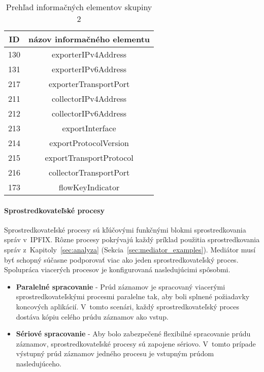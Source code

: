 \tabcolsep=8pt
\begin{table}[!ht]\caption{Prehľad informačných elementov skupiny 2}\label{t:ie-group2}
\smallskip
\centering
\begin{tabular}{|c|c|}
\hline
\textbf{ID} & \textbf{názov informačného elementu} \\ \hline
130 & exporterIPv4Address \\ \hline
131 & exporterIPv6Address \\ \hline
217 & exporterTransportPort \\ \hline
211 & collectorIPv4Address \\ \hline
212 & collectorIPv6Address \\ \hline
213 & exportInterface \\ \hline
214 & exportProtocolVersion \\ \hline
215 & exportTransportProtocol \\ \hline
216 & collectorTransportPort \\ \hline
173 & flowKeyIndicator \\ \hline
\end{tabular}
\end{table}

\paragraph{Sprostredkovateľské procesy} \label{sec:framework_intermediate}

Sprostredkovateľské procesy sú kľúčovými funkčnými blokmi sprostredkovania správ v~IPFIX. Rôzne procesy 
pokrývajú každý príklad použitia sprostredkovania správ z~Kapitoly~\ref{sec:analyza} 
(Sekcia~\ref{sec:mediator_examples}). 
Mediátor musí byť schopný súčasne podporovať viac ako jeden sprostredkovateľský proces. Spolupráca viacerých 
procesov je konfigurovaná nasledujúcimi spôsobmi.

\begin{itemize}
 \item \textbf{Paralelné spracovanie} - Prúd záznamov je spracovaný viacerými sprostredkovateľskými procesmi 
 paralelne tak, aby boli splnené požiadavky koncových aplikácií. V~tomto scenári, každý 
 sprostredkovateľský proces dostáva kópiu celého prúdu záznamov ako vstup.
 \item \textbf{Sériové spracovanie} - Aby bolo zabezpečené flexibilné spracovanie prúdu záznamov, sprostredkovateľské
 procesy sú zapojene sériovo. V~tomto prípade výstupný prúd záznamov jedného procesu je vstupným prúdom 
 nasledujúceho.
\end{itemize}






















